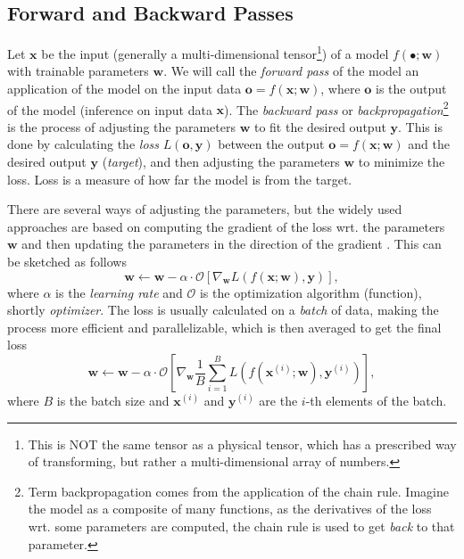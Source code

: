 \subsection{Forward and Backward Passes}
\label{sec:forward_backward}
Let $\pmb{x}$ be the input (generally a multi-dimensional tensor\footnote{This is NOT the same tensor as a physical tensor, which has a prescribed way of transforming, but rather a multi-dimensional array of numbers.}) of a model  $f(\bullet;\pmb{w})$ with trainable parameters $\pmb{w}$.
We will call the \emph{forward pass} of the model an application of the model on the input data $\pmb{o} = f(\pmb{x};\pmb{w})$, where $\pmb{o}$ is the output of the model (inference on input data $\pmb{x}$).
The \emph{backward pass} or \emph{backpropagation}\footnote{Term backpropagation comes from the application of the chain rule. Imagine the model as a composite of many functions, as the derivatives of the loss wrt. some parameters are computed, the chain rule is used to get \emph{back} to that parameter.} is the process of adjusting the parameters $\pmb{w}$ to fit the desired output $\pmb{y}$.
This is done by calculating the \emph{loss} $L(\pmb{o},\pmb{y})$ between the output $\pmb{o} = f(\pmb{x};\pmb{w})$ and the desired output $\pmb{y}$ (\emph{target}), and then adjusting the parameters $\pmb{w}$ to minimize the loss.
Loss is a measure of how far the model is from the target.

There are several ways of adjusting the parameters, but the widely used approaches are based on computing the gradient of the loss wrt. the parameters $\pmb{w}$ and then updating the parameters in the direction of the gradient \cite{deeplearningbook}. 
This can be sketched as follows
\begin{equation}
    \pmb{w} \leftarrow \pmb{w} - \alpha \cdot \mathcal{O}\left[\nabla_{\pmb{w}} L(f(\pmb{x};\pmb{w}),\pmb{y})\right],
\end{equation}
where $\alpha$ is the \emph{learning rate} and $\mathcal{O}$ is the optimization algorithm (function), shortly \emph{optimizer}.
 The loss is usually calculated on a \emph{batch} of data, making the process more efficient and parallelizable,  which is then averaged to get the final loss
\begin{equation}
    \pmb{w} \leftarrow \pmb{w} - \alpha \cdot \mathcal{O}\left[ \nabla_{\pmb{w}} \frac1B \sum_{i=1}^B L(f(\pmb{x}^{(i)};\pmb{w}),\pmb{y}^{(i)})\right],
\end{equation}
where $B$ is the batch size and $\pmb{x}^{(i)}$ and $\pmb{y}^{(i)}$ are the $i$-th elements of the batch.

